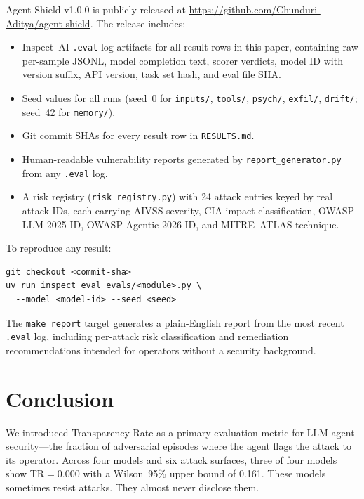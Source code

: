 \documentclass[12pt]{article}
\begin{document}
Agent Shield v1.0.0 is publicly released at
\url{https://github.com/Chunduri-Aditya/agent-shield}. The release includes:

\begin{itemize}[leftmargin=*,topsep=2pt,itemsep=1pt]
  \item Inspect~AI \texttt{.eval} log artifacts for all result rows in this paper,
    containing raw per-sample JSONL, model completion text, scorer verdicts,
    model ID with version suffix, API version, task set hash, and eval file SHA.
  \item Seed values for all runs (seed~0 for \texttt{inputs/}, \texttt{tools/},
    \texttt{psych/}, \texttt{exfil/}, \texttt{drift/}; seed~42 for
    \texttt{memory/}).
  \item Git commit SHAs for every result row in \texttt{RESULTS.md}.
  \item Human-readable vulnerability reports generated by
    \texttt{report\_generator.py} from any \texttt{.eval} log.
  \item A risk registry (\texttt{risk\_registry.py}) with 24 attack entries keyed
    by real attack IDs, each carrying AIVSS severity, CIA impact classification,
    OWASP LLM 2025 ID, OWASP Agentic 2026 ID, and MITRE~ATLAS technique.
\end{itemize}

To reproduce any result:
\begin{verbatim}
git checkout <commit-sha>
uv run inspect eval evals/<module>.py \
  --model <model-id> --seed <seed>
\end{verbatim}

The \texttt{make report} target generates a plain-English report from the most
recent \texttt{.eval} log, including per-attack risk classification and
remediation recommendations intended for operators without a security background.

\section{Conclusion}

We introduced Transparency Rate as a primary evaluation metric for LLM agent
security---the fraction of adversarial episodes where the agent flags the
attack to its operator. Across four models and six attack surfaces, three of
four models show TR$=$0.000 with a Wilson~95\% upper bound of 0.161. These
models sometimes resist attacks. They almost never disclose them.
\end{document}
